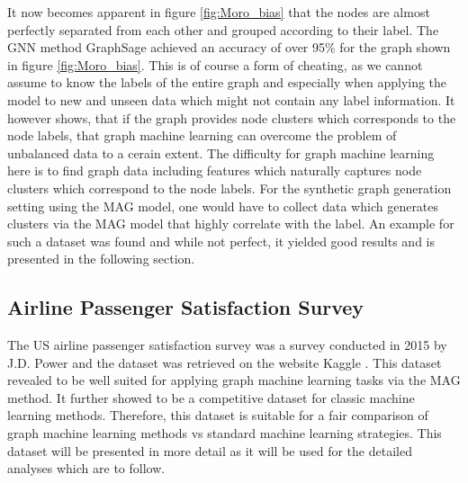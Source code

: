   \noindent It now becomes apparent in figure \ref{fig:Moro_bias} that the
  nodes are almost perfectly separated from each other and grouped according to 
  their label. The GNN method GraphSage achieved an accuracy of over 95\% for 
  the graph shown in figure \ref{fig:Moro_bias}. This is of course a form of 
  cheating, as we cannot assume to know the labels of the entire graph and 
  especially when applying the model to new and unseen data which might not 
  contain any label information. It however shows, that if the graph provides 
  node clusters which corresponds to the node labels, that graph machine 
  learning can overcome the problem of unbalanced data to a cerain extent. 
  The difficulty for graph machine learning here is to find graph data including 
  features which naturally captures node clusters which correspond to the node 
  labels. For the synthetic graph generation setting using the MAG model, one 
  would have to collect data which generates clusters via the MAG model that 
  highly correlate with the label. An example for such a dataset was found and 
  while not perfect, it yielded good results and is presented in the following 
  section. 

  \subsection{Airline Passenger Satisfaction Survey}
  
  The US airline passenger satisfaction survey was a survey conducted in 2015
  by J.D. Power and the dataset was retrieved on the website Kaggle
  \citep{JDPower2015,KAGGLE2015}. This dataset revealed to be well suited for
  applying graph machine learning tasks via the MAG method. It further showed
  to be a competitive dataset for classic machine learning methods. Therefore,
  this dataset is suitable for a fair comparison of graph machine learning
  methods vs standard machine learning strategies. This dataset will be
  presented in more detail as it will be used for the detailed analyses which
  are to follow. \\

